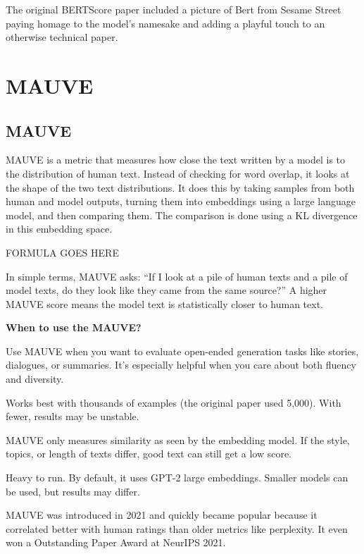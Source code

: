 \clearpage

\thispagestyle{customstyle}

{The original BERTScore paper included a picture of Bert from Sesame Street paying homage to the model’s namesake and adding a playful touch to an
otherwise technical paper.}

\clearpage
\thispagestyle{genaistyle}
\section{MAUVE}
\subsection{MAUVE}


MAUVE is a metric that measures how close the text written by a model is to the distribution of human text. Instead of checking for word overlap,
it looks at the shape of the two text distributions. It does this by taking samples from both human and model outputs, turning them into embeddings
using a large language model, and then comparing them. The comparison is done using a KL divergence in this embedding space. 

\begin{center}
    FORMULA GOES HERE
\end{center}

In simple terms, MAUVE asks: “If I look at a pile of human texts and a pile of model texts, do they look like they came from the same source?”
A higher MAUVE score means the model text is statistically closer to human text.

\textbf{When to use the MAUVE?}

Use MAUVE when you want to evaluate open-ended generation tasks like stories, dialogues, or summaries. It’s especially helpful when you care
about both fluency and diversity.

{
\item Works best with thousands of examples (the original paper used 5,000). With fewer, results may be unstable.
\item MAUVE only measures similarity as seen by the embedding model. If the style, topics, or length of texts differ, good text can still get
a low score.
\item Heavy to run. By default, it uses GPT-2 large embeddings. Smaller models can be used, but results may differ.
}

\clearpage

\thispagestyle{customstyle}

{MAUVE was introduced in 2021 and quickly became popular because it correlated better with human ratings than older metrics like perplexity.
It even won a Outstanding Paper Award at NeurIPS 2021.}